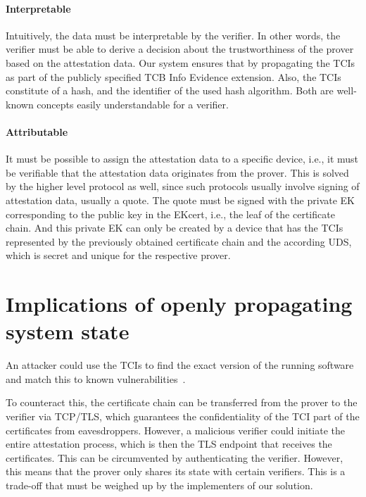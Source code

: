 \paragraph{Interpretable}
Intuitively, the data must be interpretable by the verifier.
In other words, the verifier must be able to derive a decision about the trustworthiness of the prover based on the attestation data.
Our system ensures that by propagating the TCIs as part of the publicly specified TCB Info Evidence extension.
Also, the TCIs constitute of a hash, and the identifier of the used hash algorithm.
Both are well-known concepts easily understandable for a verifier.

\paragraph{Attributable}
It must be possible to assign the attestation data to a specific device, i.e., it must be verifiable that the attestation data originates from the prover.
This is solved by the higher level protocol as well, since such protocols usually involve signing of attestation data, usually a quote.
The quote must be signed with the private EK corresponding to the public key in the EKcert, i.e., the leaf of the certificate chain.
And this private EK can only be created by a device that has the TCIs represented by the previously obtained certificate chain and the according UDS, which is secret and unique for the respective prover.



\section{Implications of openly propagating system state}

An attacker could use the TCIs to find the exact version of the running software and match this to known vulnerabilities~\cite{rfc9334}.

To counteract this, the certificate chain can be transferred from the prover to the verifier via TCP/TLS, which guarantees the confidentiality of the TCI part of the certificates from eavesdroppers.
However, a malicious verifier could initiate the entire attestation process, which is then the TLS endpoint that receives the certificates.
This can be circumvented by authenticating the verifier.
However, this means that the prover only shares its state with certain verifiers.
This is a trade-off that must be weighed up by the implementers of our solution.


